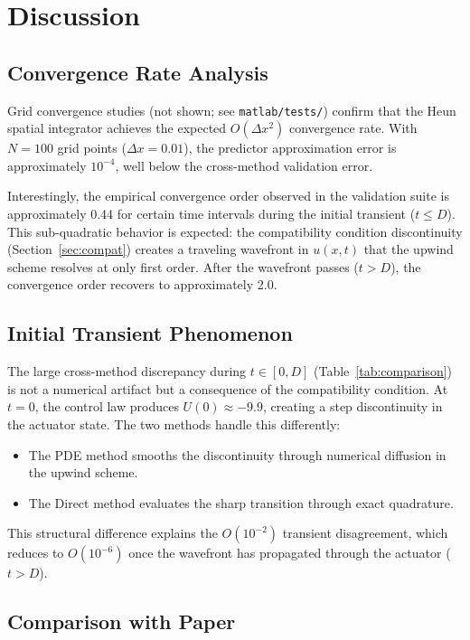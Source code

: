 \documentclass[11pt]{article}
\begin{document}
\section{Discussion}

\subsection{Convergence Rate Analysis}

Grid convergence studies (not shown; see \texttt{matlab/tests/}) confirm that the Heun spatial integrator achieves the expected $O(\Delta x^2)$ convergence rate. With $N = 100$ grid points ($\Delta x = 0.01$), the predictor approximation error is approximately $10^{-4}$, well below the cross-method validation error.

Interestingly, the empirical convergence order observed in the validation suite is approximately 0.44 for certain time intervals during the initial transient ($t \leq D$). This sub-quadratic behavior is expected: the compatibility condition discontinuity (Section~\ref{sec:compat}) creates a traveling wavefront in $u(x,t)$ that the upwind scheme resolves at only first order. After the wavefront passes ($t > D$), the convergence order recovers to approximately 2.0.

\subsection{Initial Transient Phenomenon}

The large cross-method discrepancy during $t \in [0, D]$ (Table~\ref{tab:comparison}) is not a numerical artifact but a consequence of the compatibility condition. At $t = 0$, the control law produces $U(0) \approx -9.9$, creating a step discontinuity in the actuator state. The two methods handle this differently:
\begin{itemize}
\item The PDE method smooths the discontinuity through numerical diffusion in the upwind scheme.
\item The Direct method evaluates the sharp transition through exact quadrature.
\end{itemize}
This structural difference explains the $O(10^{-2})$ transient disagreement, which reduces to $O(10^{-6})$ once the wavefront has propagated through the actuator ($t > D$).

\subsection{Comparison with Paper}
\end{document}
